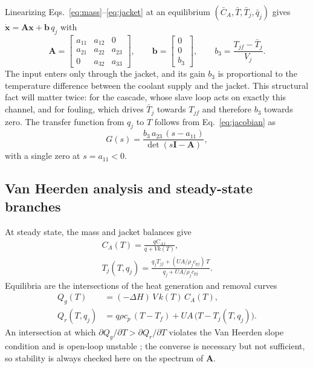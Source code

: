 Linearizing Eqs.~\eqref{eq:mass}--\eqref{eq:jacket} at an equilibrium $(\bar C_A,\bar T,\bar T_j,\bar q_j)$ gives $\dot{\mathbf{x}}=\mathbf{A}\mathbf{x}+\mathbf{b}\,q_j$ with
\begin{equation}
\mathbf{A}=\begin{bmatrix} a_{11} & a_{12} & 0\\ a_{21} & a_{22} & a_{23}\\ 0 & a_{32} & a_{33}\end{bmatrix},\qquad
\mathbf{b}=\begin{bmatrix}0\\0\\ b_3\end{bmatrix},\qquad b_3=\frac{T_{jf}-\bar T_j}{V_j}.
\label{eq:jacobian}
\end{equation}
The input enters only through the jacket, and its gain $b_3$ is proportional to the temperature difference between the coolant supply and the jacket. This structural fact will matter twice: for the cascade, whose slave loop acts on exactly this channel, and for fouling, which drives $\bar T_j$ towards $T_{jf}$ and therefore $b_3$ towards zero. The transfer function from $q_j$ to $T$ follows from Eq.~\eqref{eq:jacobian} as
\begin{equation}
G(s)=\frac{b_3\,a_{23}\,(s-a_{11})}{\det(s\mathbf{I}-\mathbf{A})},
\label{eq:gs}
\end{equation}
with a single zero at $s=a_{11}<0$.

\subsection{Van Heerden analysis and steady-state branches}
At steady state, the mass and jacket balances give
\begin{gather}
C_A(T)=\frac{qC_{Af}}{q+Vk(T)},\\
T_j(T,q_j)=\frac{q_jT_{jf}+(UA/\rho_jc_{pj})\,T}{q_j+UA/\rho_jc_{pj}}.
\end{gather}
Equilibria are the intersections of the heat generation and removal curves \cite{aris1958analysis,uppal1974dynamic,alvarez1989global}
\begin{align}
Q_g(T) &= (-\Delta H)\,V\,k(T)\,C_A(T), \label{eq:qg}\\
Q_r(T,q_j) &= q\rho c_p\,(T-T_f) + UA\,\bigl(T-T_j(T,q_j)\bigr). \label{eq:qr}
\end{align}
An intersection at which $\partial Q_g/\partial T>\partial Q_r/\partial T$ violates the Van Heerden slope condition and is open-loop unstable \cite{seborg2010process,bequette2003process,luyben2007chemical}; the converse is necessary but not sufficient, so stability is always checked here on the spectrum of $\mathbf{A}$.

